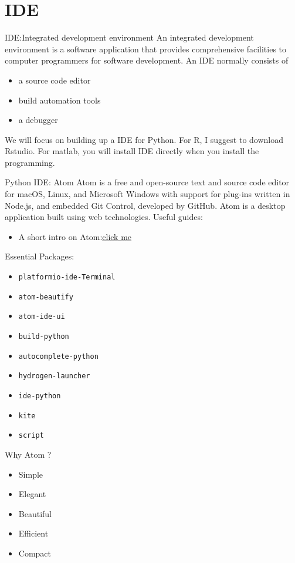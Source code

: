\documentclass[handout]{beamer} %
\begin{document}
\section{IDE}

\begin{frame}{IDE:Integrated development environment}
	An integrated development environment is a software application that provides comprehensive facilities to computer programmers for software development. An IDE normally consists of 
	\begin{itemize}
	\setlength\itemsep{1em}
		\item a source code editor
		\item build automation tools
		\item a debugger
	\end{itemize} 
We will focus on building up a IDE for Python. For R, I suggest to download Rstudio. For matlab, you will install IDE directly when you install the programming. 
\end{frame}

\begin{frame}{Python IDE: Atom}
	Atom is a free and open-source text and source code editor for macOS, Linux, and Microsoft Windows with support for plug-ins written in Node.js, and embedded Git Control, developed by GitHub. Atom is a desktop application built using web technologies. Useful guides:
	\begin{itemize}
		\item A short intro on Atom:\href{https://blog.atom.io/2017/09/12/announcing-atom-ide.html}{click me \Coffeecup}
	\end{itemize}
Essential Packages:
\begin{itemize}
	\item \texttt{platformio-ide-Terminal}
	\item \texttt{atom-beautify}
	\item \texttt{atom-ide-ui}
	\item \texttt{build-python}
	\item \texttt{autocomplete-python}
	\item \texttt{hydrogen-launcher}
	\item \texttt{ide-python}
	\item \texttt{kite}
	\item \texttt{script}
\end{itemize}
\end{frame}

\begin{frame}{Why Atom ?}
	\begin{itemize}
	\setlength\itemsep{1em}
		\item Simple 
		\item Elegant 
		\item Beautiful
		\item Efficient
		\item Compact
	\end{itemize}
\end{frame}
\end{document}
